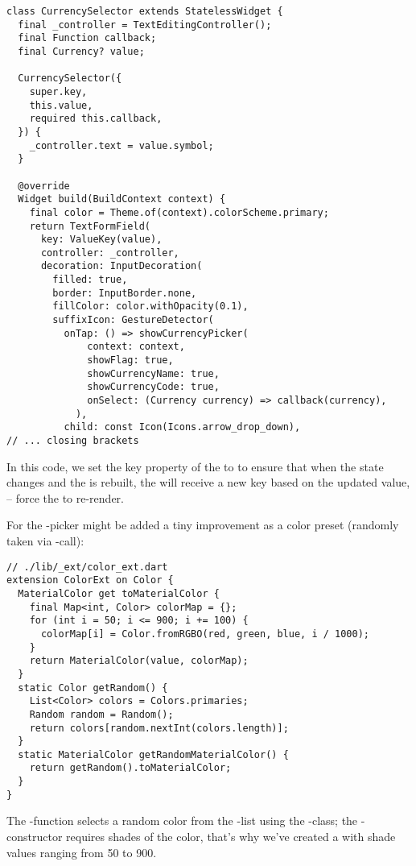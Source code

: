 \begin{lstlisting}
class CurrencySelector extends StatelessWidget {
  final _controller = TextEditingController();
  final Function callback;
  final Currency? value;

  CurrencySelector({
    super.key,
    this.value,
    required this.callback,
  }) {
    _controller.text = value.symbol;
  }

  @override
  Widget build(BuildContext context) {
    final color = Theme.of(context).colorScheme.primary;
    return TextFormField(
      key: ValueKey(value),
      controller: _controller,
      decoration: InputDecoration(
        filled: true,
        border: InputBorder.none,
        fillColor: color.withOpacity(0.1),
        suffixIcon: GestureDetector(
          onTap: () => showCurrencyPicker(
              context: context,
              showFlag: true,
              showCurrencyName: true,
              showCurrencyCode: true,
              onSelect: (Currency currency) => callback(currency),
            ),
          child: const Icon(Icons.arrow_drop_down),
// ... closing brackets
\end{lstlisting}

\noindent In this code, we set the key property of the  to  to ensure that when the 
state changes and the  is rebuilt, the  will receive a new key based on the updated 
value, -- force the  to re-render.

For the -picker might be added a tiny improvement as a color preset (randomly taken via 
-call):

\begin{lstlisting}
// ./lib/_ext/color_ext.dart
extension ColorExt on Color {
  MaterialColor get toMaterialColor {
    final Map<int, Color> colorMap = {};
    for (int i = 50; i <= 900; i += 100) {
      colorMap[i] = Color.fromRGBO(red, green, blue, i / 1000);
    }
    return MaterialColor(value, colorMap);
  }
  static Color getRandom() {
    List<Color> colors = Colors.primaries;
    Random random = Random();
    return colors[random.nextInt(colors.length)];
  }
  static MaterialColor getRandomMaterialColor() {
    return getRandom().toMaterialColor;
  }
}
\end{lstlisting}

\noindent The -function selects a random color from the -list using the 
-class; the -constructor requires shades of the color, that's why we've created a  
with shade values ranging from 50 to 900.

